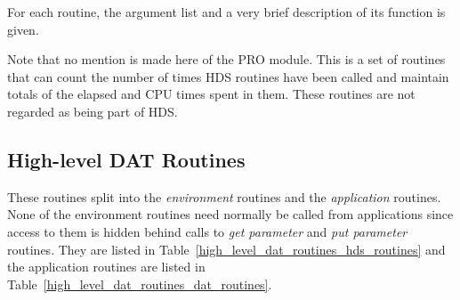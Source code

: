 For each routine, the argument list and a very brief description of its
function is given.

Note that no mention is made here of the PRO module. This is a set of routines
that can count the number of times HDS routines have been called and maintain
totals of the elapsed and CPU times spent in them. These routines are not
regarded as being part of HDS.

\subsection {High-level DAT Routines}

These routines split into the {\em environment} routines and the {\em
application} routines. None of the environment routines need normally be called
from applications since access to them is hidden behind calls to {\em get
parameter} and {\em put parameter} routines. They are listed in
Table~\ref{high_level_dat_routines_hds_routines} and the application routines
are listed in Table~\ref{high_level_dat_routines_dat_routines}. 

